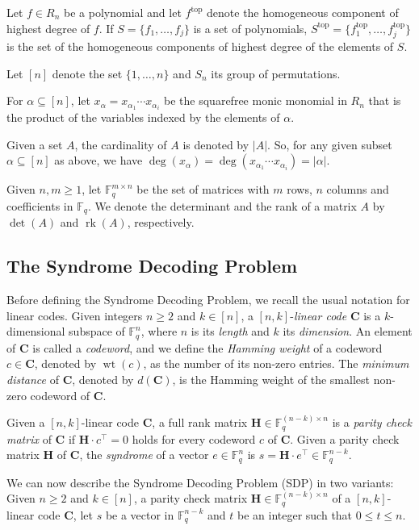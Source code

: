 \documentclass[11pt]{article}
\newcommand{\F}[0]{\mathbb{F}}
\newcommand{\Fq}[0]{\mathbb{F}_q}
\theoremstyle{plain}
\theoremstyle{definition}
\theoremstyle{remark}
\begin{document}
Let $f\in R_n$ be a polynomial and let $f^{\operatorname{top}}$ denote the homogeneous component of highest degree of $f$. If $S=\{f_1,\dots,f_j\}$ is a set of polynomials, $S^{\operatorname{top}}=\{f_1^{\operatorname{top}},\dots,f_j^{\operatorname{top}}\}$ is the set of the homogeneous components of highest degree of the elements of $S$.

Let $[n]$ denote the set $\{1,\dots,n\}$ and $S_n$ its group of permutations.

For $\alpha \subseteq [n]$, let $x_\alpha= x_{\alpha_1}\cdots x_{\alpha_i}$ be the squarefree monic monomial in $R_n$ that is the product of the variables indexed by the elements of $\alpha$.

Given a set $A$, the cardinality of $A$ is denoted by $|A|$. So, for any given subset $\alpha\subseteq [n]$ as above, we have $\operatorname{deg}(x_\alpha)=\operatorname{deg}(x_{\alpha_1}\cdots x_{\alpha_i})=\lvert\alpha\rvert$.
 
Given $n,m\geq 1$, let $\F_q^{m\times n}$ be the set of matrices with $m$ rows, $n$ columns and coefficients in $\F_q$. We denote the determinant and the rank of a matrix $A$ by $\operatorname{det}(A)$ and $\operatorname{rk}(A)$, respectively.

\subsection{The Syndrome Decoding Problem}
Before defining the Syndrome Decoding Problem, we recall the usual notation for linear codes. Given integers $n\geq 2$ and $k\in [n]$, a $[n,k]$-\textit{linear code} $\mathbf{C}$ is a $k$-dimensional subspace of $\Fq^n$, where $n$ is its \textit{length} and $k$ its \textit{dimension}. An element of $\mathbf{C}$ is called a \textit{codeword}, and we define the \textit{Hamming weight} of a codeword $c\in\mathbf{C}$, denoted by $\operatorname{wt}(c)$, as the number of its non-zero entries. The \textit{minimum distance} of $\mathbf{C}$, denoted by $d(\mathbf{C})$, is the Hamming weight of the smallest non-zero codeword of $\mathbf{C}$.

Given a $[n, k]$-linear code $\mathbf{C}$, a full rank matrix $\mathbf{H}\in\F_q^{(n-k)\times n}$ is a \textit{parity check matrix} of $\mathbf{C}$ if $\mathbf{H}\cdot c^\top=0$ holds for every codeword $c$ of $\mathbf{C}$. Given a parity check matrix $\mathbf{H}$ of $\mathbf{C}$, the \textit{syndrome} of a vector $e\in\F_q^n$ is $s=\mathbf{H}\cdot e^\top\in\F_q^{n-k}$.

We can now describe the Syndrome Decoding Problem (SDP) in two variants: Given $n\geq 2$ and $k\in [n]$, a parity check matrix \mbox{$\mathbf{H}\in\F_q^{(n-k)\times n}$} of a $\left[n, k\right]$-linear code $\mathbf{C}$, let $s$ be a vector in $\F_q^{n-k}$ and $t$ be an integer such that $0\leq t\leq n$.
\end{document}
